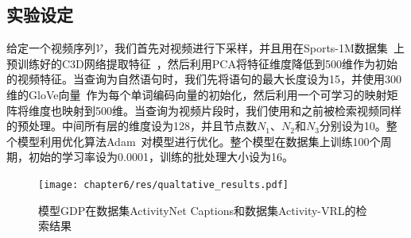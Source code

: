 \subsection{实验设定}
给定一个视频序列$\mathcal{V}$，我们首先对视频进行下采样，并且用在Sports-1M数据集~\cite{karpathy2014large}上预训练好的C3D网络提取特征~\cite{tran2015learning}，然后利用PCA将特征维度降低到500维作为初始的视频特征。当查询为自然语句时，我们先将语句的最大长度设为15，并使用300维的GloVe向量~\cite{pennington2014glove}作为每个单词编码向量的初始化，然后利用一个可学习的映射矩阵将维度也映射到500维。当查询为视频片段时，我们使用和之前被检索视频同样的预处理。中间所有层的维度设为128，并且节点数$N_1$、$N_2$和$N_3$分别设为10。整个模型利用优化算法Adam~\cite{kingma2015adam}对模型进行优化。整个模型在数据集上训练100个周期，初始的学习率设为0.0001，训练的批处理大小设为16。

\begin{figure}[t]
    \centering
    \texttt{[image: chapter6/res/qualtative\_results.pdf]}
    \caption{模型GDP在数据集ActivityNet Captions和数据集Activity-VRL的检索结果}
    \label{ch6:fig:qualtative_results}
\end{figure}


